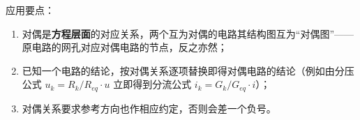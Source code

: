 应用要点：
\begin{enumerate}
  \item 对偶是\textbf{方程层面}的对应关系，两个互为对偶的电路其结构图互为“对偶图”——原电路的网孔对应对偶电路的节点，反之亦然；
  \item 已知一个电路的结论，按对偶关系逐项替换即得对偶电路的结论（例如由分压公式 $u_k=R_k/R_{eq}\cdot u$ 立即得到分流公式 $i_k=G_k/G_{eq}\cdot i$）；
  \item 对偶关系要求参考方向也作相应约定，否则会差一个负号。
\end{enumerate}


\endinput
